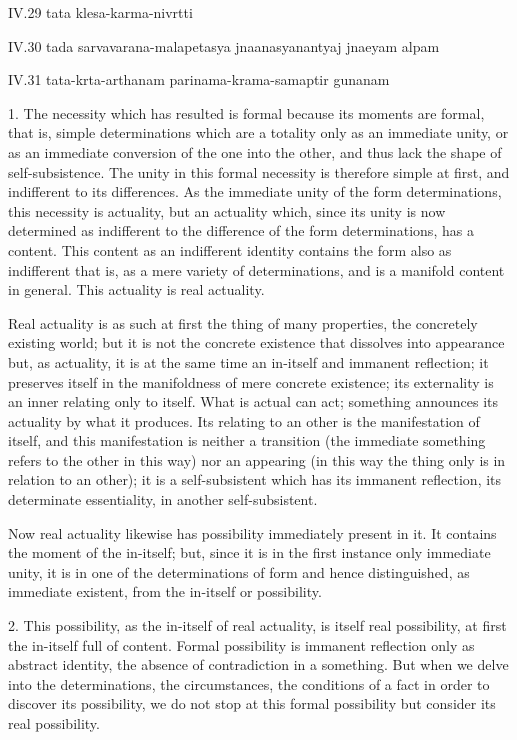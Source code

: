 IV.29
tata klesa-karma-nivrtti

IV.30
tada sarvavarana-malapetasya jnaanasyanantyaj jnaeyam alpam

IV.31
tata-krta-arthanam parinama-krama-samaptir gunanam

1. The necessity which has resulted is formal
because its moments are formal,
that is, simple determinations which are a totality
only as an immediate unity,
or as an immediate conversion of the one into the other,
and thus lack the shape of self-subsistence.
The unity in this formal necessity is therefore simple at first,
and indifferent to its differences.
As the immediate unity of the form determinations,
this necessity is actuality,
but an actuality which, since its unity is now determined as indifferent
to the difference of the form determinations, has a content.
This content as an indifferent identity contains the form
also as indifferent that is, as a mere variety of determinations,
and is a manifold content in general.
This actuality is real actuality.

Real actuality is as such at first
the thing of many properties,
the concretely existing world;
but it is not the concrete existence
that dissolves into appearance
but, as actuality, it is at the same time
an in-itself and immanent reflection;
it preserves itself in the manifoldness of mere concrete existence;
its externality is an inner relating only to itself.
What is actual can act;
something announces its actuality by what it produces.
Its relating to an other is the manifestation of itself,
and this manifestation is
neither a transition
(the immediate something refers to the other in this way)
nor an appearing
(in this way the thing only is in relation to an other);
it is a self-subsistent which has its immanent reflection,
its determinate essentiality, in another self-subsistent.

Now real actuality likewise has possibility immediately present in it.
It contains the moment of the in-itself;
but, since it is in the first instance only immediate unity,
it is in one of the determinations of form
and hence distinguished, as immediate existent,
from the in-itself or possibility.

2. This possibility, as the in-itself of real actuality,
is itself real possibility, at first the in-itself full of content.
Formal possibility is immanent reflection only as abstract identity,
the absence of contradiction in a something.
But when we delve into the determinations,
the circumstances, the conditions of a fact
in order to discover its possibility,
we do not stop at this formal possibility
but consider its real possibility.

